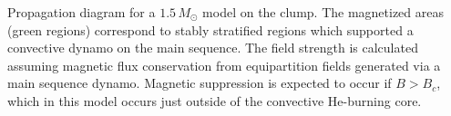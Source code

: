 \label{fig:ClumpProp}
Propagation diagram for a $1.5 \, M_\odot$ model on the clump. The magnetized areas (green regions) correspond to stably stratified regions which supported a convective dynamo on the main sequence. The field strength is calculated assuming magnetic flux conservation from equipartition fields generated via a main sequence dynamo. Magnetic suppression is expected to occur if $B \! > \! B_c$, which in this model occurs just outside of the convective He-burning core.